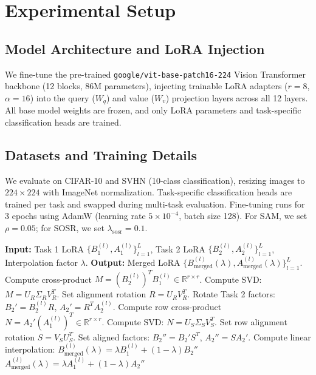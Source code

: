\documentclass{article}
\theoremstyle{plain}
\theoremstyle{definition}
\theoremstyle{remark}
\begin{document}
\section{Experimental Setup}
\label{sec:experiments}

\subsection{Model Architecture and LoRA Injection}
We fine-tune the pre-trained \texttt{google/vit-base-patch16-224} Vision Transformer backbone (12 blocks, 86M parameters), injecting trainable LoRA adapters ($r=8$, $\alpha=16$) into the query ($W_q$) and value ($W_v$) projection layers across all 12 layers. All base model weights are frozen, and only LoRA parameters and task-specific classification heads are trained.

\subsection{Datasets and Training Details}
We evaluate on CIFAR-10 and SVHN (10-class classification), resizing images to $224 \times 224$ with ImageNet normalization. Task-specific classification heads are trained per task and swapped during multi-task evaluation. Fine-tuning runs for 3 epochs using AdamW (learning rate $5 \times 10^{-4}$, batch size 128). For SAM, we set $\rho = 0.05$; for SOSR, we set $\lambda_{\text{sosr}} = 0.1$.
\begin{algorithm}[tb]
\caption{Procrustes-Aligned Linear Merging (PALM)}
\label{alg:palm}
\begin{algorithmic}[1]
\STATE \textbf{Input:} Task 1 LoRA $\{B_1^{(l)}, A_1^{(l)}\}_{l=1}^{L}$, Task 2 LoRA $\{B_2^{(l)}, A_2^{(l)}\}_{l=1}^{L}$, Interpolation factor $\lambda$.
\STATE \textbf{Output:} Merged LoRA $\{B_{\text{merged}}^{(l)}(\lambda), A_{\text{merged}}^{(l)}(\lambda)\}_{l=1}^{L}$.
\STATE Compute cross-product $M = (B_2^{(l)})^T B_1^{(l)} \in \mathbb{R}^{r \times r}$.
\STATE Compute SVD: $M = U_R \Sigma_R V_R^T$.
\STATE Set alignment rotation $R = U_R V_R^T$.
\STATE Rotate Task 2 factors: $B_2' = B_2^{(l)} R$, $A_2' = R^T A_2^{(l)}$.
\STATE Compute row cross-product $N = A_2' (A_1^{(l)})^T \in \mathbb{R}^{r \times r}$.
\STATE Compute SVD: $N = U_S \Sigma_S V_S^T$.
\STATE Set row alignment rotation $S = V_S U_S^T$.
\STATE Set aligned factors: $B_2'' = B_2' S^T$, $A_2'' = S A_2'$.
\STATE Compute linear interpolation:
\STATE \quad $B_{\text{merged}}^{(l)}(\lambda) = \lambda B_1^{(l)} + (1-\lambda) B_2''$
\STATE \quad $A_{\text{merged}}^{(l)}(\lambda) = \lambda A_1^{(l)} + (1-\lambda) A_2''$
\ENDFOR
\end{algorithmic}
\end{algorithm}
\end{document}
